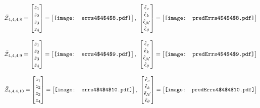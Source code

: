 \documentclass[12pt]{article}
\begin{document}
\begin{gather*}
\bar{\mathcal{Z}}_{4,4,4,8}=\begin{bmatrix}
z_1\\
z_2\\
z_3\\
z_4
 \end{bmatrix}= \begin{bmatrix}
\vcenter{\hbox{\texttt{[image: errs4\$4\$4\$8.pdf]}}}
 \end{bmatrix},\,\, \begin{bmatrix}
\hat{\epsilon}_c\\\hat{\epsilon}_k\\\hat{\epsilon}_\mathcal{N}\\\hat{\epsilon}_\theta
 \end{bmatrix}=\begin{bmatrix}
\vcenter{\hbox{\texttt{[image: predErrs4\$4\$4\$8.pdf]}}}
 \end{bmatrix}
\end{gather*}



\begin{gather*}
\bar{\mathcal{Z}}_{4,4,4,9}=\begin{bmatrix}
z_1\\
z_2\\
z_3\\
z_4
 \end{bmatrix}= \begin{bmatrix}
\vcenter{\hbox{\texttt{[image: errs4\$4\$4\$9.pdf]}}}
 \end{bmatrix},\,\, \begin{bmatrix}
\hat{\epsilon}_c\\\hat{\epsilon}_k\\\hat{\epsilon}_\mathcal{N}\\\hat{\epsilon}_\theta
 \end{bmatrix}=\begin{bmatrix}
\vcenter{\hbox{\texttt{[image: predErrs4\$4\$4\$9.pdf]}}}
 \end{bmatrix}
\end{gather*}

\begin{gather*}
\bar{\mathcal{Z}}_{4,4,4,10}=\begin{bmatrix}
z_1\\
z_2\\
z_3\\
z_4
 \end{bmatrix}= \begin{bmatrix}
\vcenter{\hbox{\texttt{[image: errs4\$4\$4\$10.pdf]}}}
 \end{bmatrix},\,\, \begin{bmatrix}
\hat{\epsilon}_c\\\hat{\epsilon}_k\\\hat{\epsilon}_\mathcal{N}\\\hat{\epsilon}_\theta
 \end{bmatrix}=\begin{bmatrix}
\vcenter{\hbox{\texttt{[image: predErrs4\$4\$4\$10.pdf]}}}
 \end{bmatrix}
\end{gather*}
\end{document}
